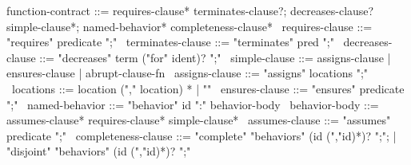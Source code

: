 \begin{syntax}
  function-contract ::= requires-clause* terminates-clause?;
                        decreases-clause? simple-clause*;
                        named-behavior* completeness-clause*
  \
  requires-clause ::= "requires" predicate ";"
  \
  terminates-clause ::= "terminates" pred ";"
  \
  decreases-clause ::= "decreases" term ("for" ident)? ";"
  \
  simple-clause ::= assigns-clause | ensures-clause | abrupt-clause-fn
  \
  assigns-clause ::= "assigns" locations ";"
  \
  locations ::= location ("," location) * | "\nothing"
  \
  ensures-clause ::= "ensures" predicate ";"
  \
  named-behavior ::= "behavior" id ":" behavior-body
  \
  behavior-body ::= assumes-clause* {requires-clause}* simple-clause* 
  \
  assumes-clause ::= "assumes" predicate ";"
  \
  completeness-clause ::= "complete" "behaviors" (id (","id)*)? ";";
     | "disjoint" "behaviors" (id (","id)*)? ";"
\end{syntax}
